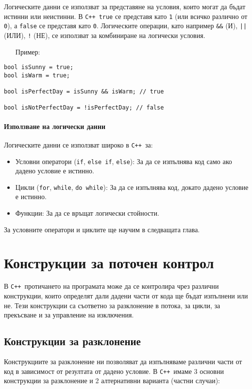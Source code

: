 \documentclass[oneside]{book}
\newcommand*{\code}[1]{\texttt{#1}}
\newcommand*{\cpp}{\texttt{C++}\ }
\begin{document}
Логическите данни се използват за представяне на условия, които могат да бъдат истинни или неистинни.
В \cpp \code{true} се представя като \code{1} (или всичко различно от \code{0}), а \code{false} се представя като \code{0}.
Логическите операции, като например \code{\&\&} (И), \code{||} (ИЛИ), \code{!} (НЕ), се използват за комбиниране на логически условия.

\begin{itemize}\item[Пример:]\end{itemize}
\begin{mdframed}\begin{lstlisting}
bool isSunny = true;
bool isWarm = true;

bool isPerfectDay = isSunny && isWarm; // true

bool isNotPerfectDay = !isPerfectDay; // false
\end{lstlisting}\end{mdframed}

\subsubsection{Използване на логически данни}
Логическите данни се използват широко в \cpp за:
\begin{itemize}
    \item Условни оператори (\code{if}, \code{else if}, \code{else}): За да се изпълнява код само ако дадено условие е истинно.
    \item Цикли (\code{for}, \code{while}, \code{do while}): За да се изпълнява код, докато дадено условие е истинно.
    \item Функции: За да се връщат логически стойности.
\end{itemize}

За условните оператори и циклите ще научим в следващата глава.

\chapter{Конструкции за поточен контрол}
В \cpp протичането на програмата може да се контролира чрез различни конструкции, които определят дали дадени части от кода ще бъдат изпълнени или не.
Тези конструкции са съответно за разклонение в потока, за цикли, за прекъсване и за управление на изключения.

\section{Конструкции за разклонение}
Конструкциите за разклонение ни позволяват да изпълняваме различни части от код в зависимост от резултата от дадено условие. В \cpp имаме 3 основни конструкции за разклонение и 2 алтернативни варианта (частни случаи):
\end{document}
